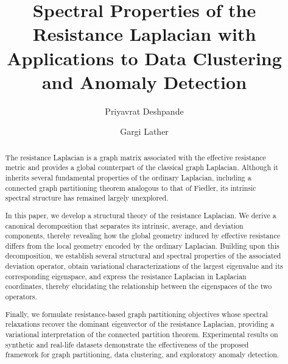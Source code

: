 \documentclass[12pt,a4paper]{amsart}
\title{Spectral Properties of the Resistance Laplacian with Applications to Data Clustering and Anomaly Detection}
\author[P. Deshpande]{Priyavrat Deshpande}
\author[G. Lather]{Gargi Lather}
\theoremstyle{remark}
\theoremstyle{definition}
\newcommand{\1}{\mathbf{1}}
\newcommand{\0}{\mathbf{0}}
\begin{document}
\begin{abstract}
The resistance Laplacian is a graph matrix associated with the effective resistance metric and provides a global counterpart of the classical graph Laplacian. 
Although it inherits several fundamental properties of the ordinary Laplacian, including a connected graph partitioning theorem analogous to that of Fiedler, its intrinsic spectral structure has remained largely unexplored.

In this paper, we develop a structural theory of the resistance Laplacian. 
We derive a canonical decomposition that separates its intrinsic, average, and deviation components, thereby revealing how the global geometry induced by effective resistance differs from the local geometry encoded by the ordinary Laplacian.
Building upon this decomposition, we establish several structural and spectral properties of the associated deviation operator, obtain variational characterizations of the largest eigenvalue and its corresponding eigenspace, and express the resistance Laplacian in Laplacian coordinates, thereby elucidating the relationship between the eigenspaces of the two operators. 

Finally, we formulate resistance-based graph partitioning objectives whose spectral relaxations recover the dominant eigenvector of the resistance Laplacian, providing a variational interpretation of the connected partition theorem. 
Experimental results on synthetic and real-life datasets demonstrate the effectiveness of the proposed framework for graph partitioning, data clustering, and exploratory anomaly detection.
\end{abstract}
\maketitle
\end{document}
